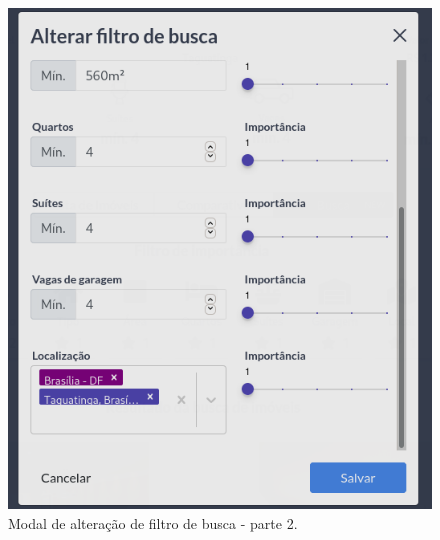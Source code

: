 \begin{figure}[H]
    \centering
    \includegraphics[scale=0.45]{figuras/desenvolvimento/componente_filtro4.png}
    \caption[Modal de alteração de filtro de busca - parte 2]{Modal de alteração de filtro de busca - parte 2.}
    \label{fig:componente_filtro4}
\end{figure}

